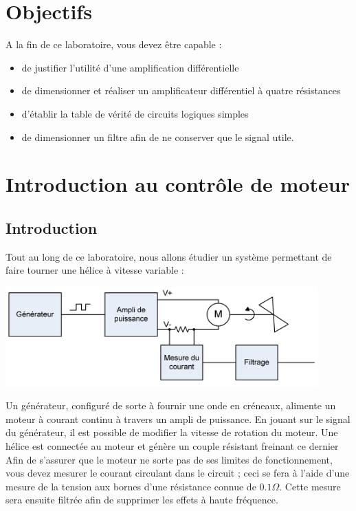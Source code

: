 \documentclass{../template/labo}
\begin{document}
\section{Objectifs}
A la fin de ce laboratoire, vous devez être capable :

\begin{itemize}
\item de justifier l'utilité d'une amplification différentielle
\item de dimensionner et réaliser un amplificateur différentiel à quatre résistances
\item d'établir la table de vérité de circuits logiques simples
\item de dimensionner un filtre afin de ne conserver que le signal utile.
\end{itemize}

\section{Introduction au contrôle de moteur}
\subsection{Introduction}

Tout au long de ce laboratoire, nous allons étudier un système permettant de faire tourner une hélice à
vitesse variable :

\begin{center}
\includegraphics[width=12cm]{sch1}
\end{center}

Un générateur, configuré de sorte à fournir une onde en créneaux, alimente un moteur à courant
continu à travers un ampli de puissance. En jouant sur le signal du générateur, il est
possible de modifier la vitesse de rotation du moteur.
Une hélice est connectée au moteur et génère un couple résistant freinant ce dernier
Afin de s'assurer que le moteur ne sorte pas de ses limites de fonctionnement, vous devez
mesurer le courant circulant dans le circuit ; ceci se fera à l'aide d'une mesure de la
tension aux bornes d'une résistance connue de $0.1\Omega$. Cette mesure sera ensuite filtrée
afin de supprimer les effets à haute fréquence.
\end{document}
